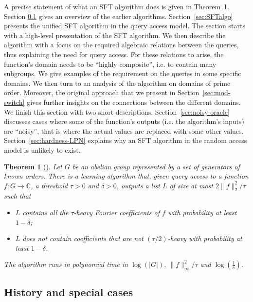 \documentclass[11pt]{article}
\newtheorem{theorem}{Theorem}
\theoremstyle{definition}
\newcommand{\C}{\mathbb{C}}
\begin{document}
A precise statement of what an SFT algorithm does is given in Theorem~\ref{thm_sft_algo}.
Section \ref{sec:history} gives an overview of the earlier algorithms.
Section~\ref{sec:SFTalgo} presents the unified SFT algorithm in the query access model. The section starts with a high-level presentation of the SFT algorithm.
We then describe the algorithm with a focus on the required algebraic relations between the queries, thus explaining the need for query access.
For these relations to arise, the function's domain needs to be ``highly composite'', i.e. to contain many subgroups. We give examples of the requirement on the queries in some specific domains. We then turn to an analysis of the algorithm on domains of prime order. Moreover, the original approach that we present in Section~\ref{sec:mod-switch} gives further insights on the connections between the different domains. We finish this section with two short descriptions. Section~\ref{sec:noisy-oracle} discusses cases where some of the function's outputs (i.e. the algorithm's inputs) are ``noisy'', that is where the actual values are replaced with some other values. Section~\ref{sec:hardness-LPN} explains why an SFT algorithm in the random access model is unlikely to exist.

\begin{theorem} [{\cite[SFT algorithm]{AKA-thesis}}{\cite[Theorem 5]{AGS}}]
    \label{thm_sft_algo}
    Let $G$ be an abelian group represented by a set of generators of known orders. There is a learning algorithm that, given query access to a function $f: G \rightarrow \C$, a threshold $\tau > 0$ and $\delta > 0$, outputs a list $L$ of size at most $2\|f\|_2^2 / \tau$ such that
    \begin{itemize}
        \item $L$ contains all the $\tau$-heavy Fourier coefficients of $f$ with probability at least $1-\delta$;
        \item $L$ does not contain coefficients that are not $(\tau/2)$-heavy with probability at least $1-\delta$.
    \end{itemize}
    The algorithm runs in polynomial time in $\log\left(|G|\right)$, $\| f \|_\infty^2 / \tau$ and $\log\left(\frac{1}{\delta}\right)$.
\end{theorem}


\subsection{History and special cases}
\label{sec:history}
\end{document}
